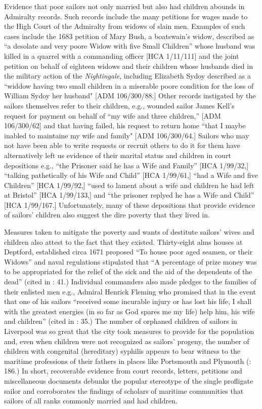   Evidence that poor sailors not only married but also had children abounds in Admiralty records. Such records include the many petitions for wages made to the High Court of the Admiralty from widows of slain men. Examples of such cases include the 1683 petition of Mary Bush, a boatswain’s widow, described as “a desolate and very poore Widow with five Small Children” whose husband was killed in a quarrel with a commanding officer [HCA 1/11/111] and the joint petition on behalf of eighteen widows and their children whose husbands died in the military action of the \textit{Nightingale}, including Elizabeth Sydoy described as a “widdow having two small children in a miserable poore condition for the loss of William Sydoy her husband" [ADM 106/300/88.] Other records instigated by the sailors themselves refer to their children, e.g., wounded sailor James Kell’s request for payment on behalf of “my wife and three children,” [ADM 106/300/62] and that having failed, his request to return home “that I maybe inabled to maintaine my wife and family" [ADM 106/300/64.] Sailors who may not have been able to write requests or recruit others to do it for them have alternatively left us evidence of their marital status and children in court depositions e.g., “the Prisoner said he has a Wife and Family” [HCA 1/99/32,] “talking pathetically of his Wife and Child” [HCA 1/99/61,] “had a Wife and five Children” [HCA 1/99/92,] “used to lament about a wife and children he had left at Bristol” [HCA 1/99/133,] and “the prisoner replyed he has a Wife and Child” [HCA 1/99/167.] Unfortunately, many of these depositions that provide evidence of sailors’ children also suggest the dire poverty that they lived in.

Measures taken to mitigate the poverty and wants of destitute sailors’ wives and children also attest to the fact that they existed. Thirty-eight alms houses at Deptford, established circa 1671 proposed “To house poor aged seamen, or their Widows” and naval regulations stipulated that “A percentage of prize money was to be appropriated for the relief of the sick and the aid of the dependents of the dead” (cited in \citealt{Brown2011}: 41.) Individual commanders also made pledges to the families of their enlisted men e.g., Admiral Henrick Fleming who promised that in the event that one of his sailors “received some incurable injury or has lost his life, I shall with the greatest energies (in so far as God spares me my life) help him, his wife and children” (cited in \citealt{Brown2011}: 35.) The number of orphaned children of sailors in Liverpool was so great that the city took measures to provide for the population \citep[86]{Litter1999} and, even when children were not recognized as sailors’ progeny, the number of children with congenital (hereditary) syphilis appears to bear witness to the maritime professions of their fathers in places like Portsmouth and Plymouth (\citealt{Brown2011}: 186.) In short, recoverable evidence from court records, letters, petitions and miscellaneous documents debunks the popular stereotype of the single profligate sailor and corroborates the findings of scholars of maritime communities that sailors of all ranks commonly married and had children. 

